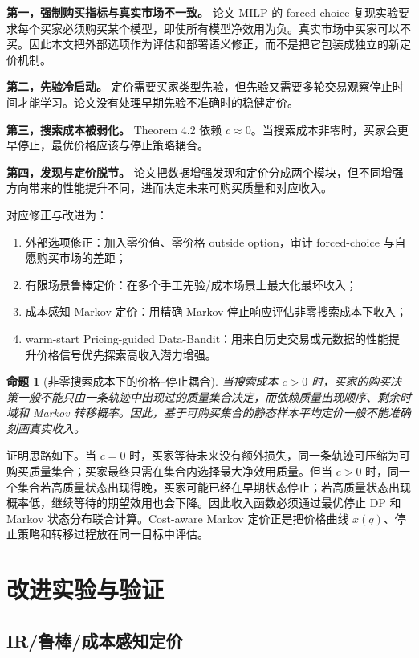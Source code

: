 \documentclass[11pt,a4paper]{ctexart}
\newtheorem{proposition}[theorem]{命题}
\theoremstyle{definition}
\begin{document}
\textbf{第一，强制购买指标与真实市场不一致。} 论文 MILP 的 forced-choice 复现实验要求每个买家必须购买某个模型，即使所有模型净效用为负。真实市场中买家可以不买。因此本文把外部选项作为评估和部署语义修正，而不是把它包装成独立的新定价机制。

\textbf{第二，先验冷启动。} 定价需要买家类型先验，但先验又需要多轮交易观察停止时间才能学习。论文没有处理早期先验不准确时的稳健定价。

\textbf{第三，搜索成本被弱化。} Theorem 4.2 依赖 $c\approx0$。当搜索成本非零时，买家会更早停止，最优价格应该与停止策略耦合。

\textbf{第四，发现与定价脱节。} 论文把数据增强发现和定价分成两个模块，但不同增强方向带来的性能提升不同，进而决定未来可购买质量和对应收入。

对应修正与改进为：
\begin{enumerate}[label=(\arabic*)]
\item 外部选项修正：加入零价值、零价格 outside option，审计 forced-choice 与自愿购买市场的差距；
\item 有限场景鲁棒定价：在多个手工先验/成本场景上最大化最坏收入；
\item 成本感知 Markov 定价：用精确 Markov 停止响应评估非零搜索成本下收入；
\item warm-start Pricing-guided Data-Bandit：用来自历史交易或元数据的性能提升价格信号优先探索高收入潜力增强。
\end{enumerate}

\begin{proposition}[非零搜索成本下的价格--停止耦合]
当搜索成本 $c>0$ 时，买家的购买决策一般不能只由一条轨迹中出现过的质量集合决定，而依赖质量出现顺序、剩余时域和 Markov 转移概率。因此，基于可购买集合的静态样本平均定价一般不能准确刻画真实收入。
\end{proposition}

证明思路如下。当 $c=0$ 时，买家等待未来没有额外损失，同一条轨迹可压缩为可购买质量集合；买家最终只需在集合内选择最大净效用质量。但当 $c>0$ 时，同一个集合若高质量状态出现得晚，买家可能已经在早期状态停止；若高质量状态出现概率低，继续等待的期望效用也会下降。因此收入函数必须通过最优停止 DP 和 Markov 状态分布联合计算。Cost-aware Markov 定价正是把价格曲线 $x(q)$、停止策略和转移过程放在同一目标中评估。

\section{改进实验与验证}

\subsection{IR/鲁棒/成本感知定价}
\end{document}
